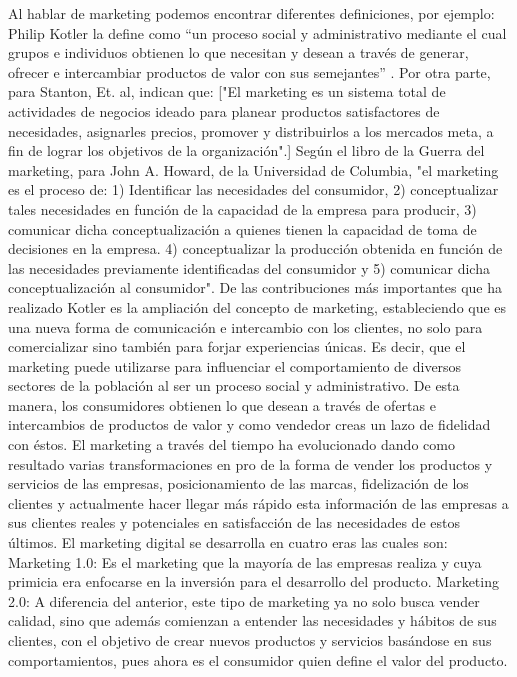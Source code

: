 \documentclass[12pt]{difu100cia} %
\begin{document}
Al hablar de marketing podemos encontrar diferentes definiciones, por ejemplo: Philip Kotler la define como “un proceso social y administrativo mediante el cual grupos e individuos obtienen lo que necesitan y desean a través de generar, ofrecer e intercambiar productos de valor con sus semejantes” .
Por otra parte, para Stanton, Et. al, indican que: ["El marketing es un sistema total de actividades de negocios ideado para planear productos satisfactores de necesidades, asignarles precios, promover y distribuirlos a los mercados meta, a fin de lograr los objetivos de la organización".]
Según el libro de la Guerra del marketing, para John A. Howard, de la Universidad de Columbia, {"el marketing es el proceso de: 1) Identificar las necesidades del consumidor, 2) conceptualizar tales necesidades en función de la capacidad de la empresa para producir, 3) comunicar dicha conceptualización a quienes tienen la capacidad de toma de decisiones en la empresa. 4) conceptualizar la producción obtenida en función de las necesidades previamente identificadas del consumidor y 5) comunicar dicha conceptualización al consumidor".}
De las contribuciones más importantes que ha realizado Kotler es la ampliación del concepto de marketing, estableciendo que es una nueva forma de comunicación e intercambio con los clientes, no solo para comercializar sino también para forjar experiencias únicas. Es decir, que el marketing puede utilizarse para influenciar el comportamiento de diversos sectores de la población al ser un proceso social y administrativo. De esta manera, los consumidores obtienen lo que desean a través de ofertas e intercambios de productos de valor y como vendedor creas un lazo de fidelidad con éstos.  
El marketing a través del tiempo ha evolucionado dando como resultado varias transformaciones en pro de la forma de vender los productos y servicios de las empresas, posicionamiento de las marcas, fidelización de los clientes y actualmente hacer llegar más rápido esta información de las empresas a sus clientes reales y potenciales en satisfacción de las necesidades de estos últimos.
El marketing digital se desarrolla en cuatro eras las cuales son:
Marketing 1.0: Es el marketing que la mayoría de las empresas realiza y cuya primicia era enfocarse en la inversión para el desarrollo del producto. 
Marketing 2.0: A diferencia del anterior, este tipo de marketing ya no solo busca vender calidad, sino que además comienzan a entender las necesidades y hábitos de sus clientes, con el objetivo de crear nuevos productos y servicios basándose en sus comportamientos, pues ahora es el consumidor quien define el valor del producto. 
\end{document}

